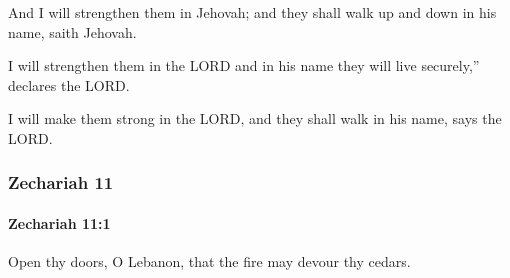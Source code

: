 			\begin{versebox}
					\item[BHS] 
					\item[LXX] 
					\item[ASV] And I will strengthen them in Jehovah; and they shall walk up and down in his name, saith Jehovah.
					\item[NIV] I will strengthen them in the LORD and in his name they will live securely,” declares the LORD.
					\item[NRSV] I will make them strong in the LORD, and they shall walk in his name, says the LORD.
			\end{versebox}
	\subsubsection{Zechariah 11} %
		\label{ZECHARIAH-11}

		\paragraph{Zechariah 11:1} %
			\label{ZECHARIAH-11-1}

			Open thy doors, O Lebanon, that the fire may devour thy cedars.

